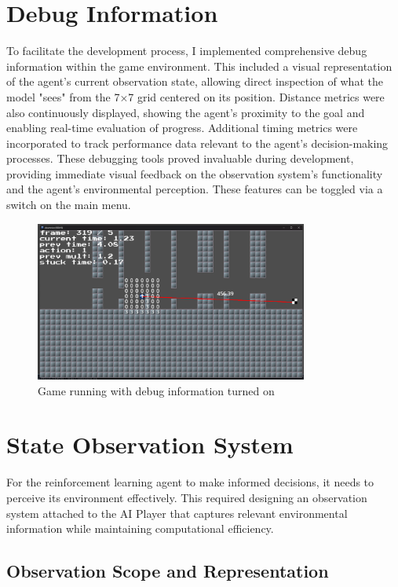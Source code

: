 \section{Debug Information}

To facilitate the development process, I implemented comprehensive debug information within the game environment. 
This included a visual representation of the agent's current observation state, allowing direct inspection of what the model "sees" from the 7×7 grid centered on its position. 
Distance metrics were also continuously displayed, showing the agent's proximity to the goal and enabling real-time evaluation of progress. 
Additional timing metrics were incorporated to track performance data relevant to the agent's decision-making processes. 
These debugging tools proved invaluable during development, providing immediate visual feedback on the observation system's functionality and the agent's environmental perception.
These features can be toggled via a switch on the main menu.

\begin{figure}[H]
    \centering
    \includegraphics[width=0.8\textwidth]{figures/debug_info}
    \caption{Game running with debug information turned on}
    \label{fig:debug_info}
\end{figure}

\section{State Observation System}

For the reinforcement learning agent to make informed decisions, it needs to perceive its environment effectively. 
This required designing an observation system attached to the AI Player that captures relevant environmental information while maintaining computational efficiency.

\subsection{Observation Scope and Representation}

